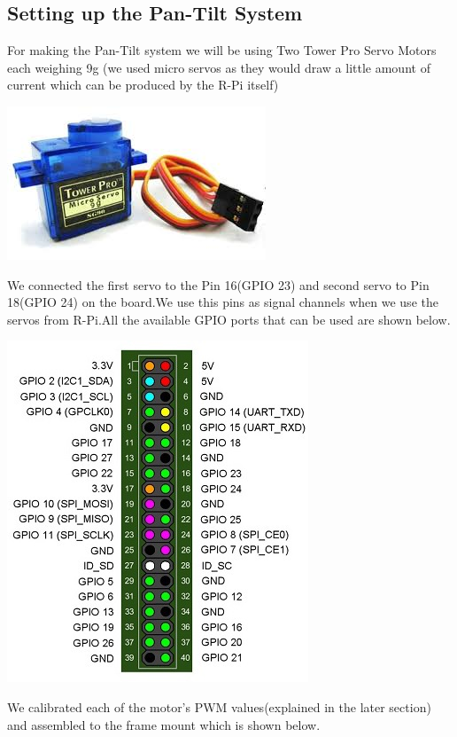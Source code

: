 \documentclass[11pt,a4paper]{article}
\begin{document}
		\subsection{Setting up the Pan-Tilt System}
		For making the Pan-Tilt system we will be using Two Tower Pro Servo Motors each weighing 9g (we used micro servos as they would draw a little amount of current which can be produced by the R-Pi itself)
		  \begin{center}
		   \includegraphics[scale=0.5]{servo.jpg}
		\end{center}
		\par We connected the first servo to the Pin 16(GPIO 23) and second servo to Pin 18(GPIO 24) on the board.We use this pins as signal channels when we use the servos from R-Pi.All the available GPIO ports that can be used are shown below.
		 \begin{center}
		   \includegraphics[scale=0.6]{gpio.jpg}
		\end{center}
		\par We calibrated each of the motor's PWM values(explained in the later section) and assembled to the frame mount which is shown below.
\end{document}
